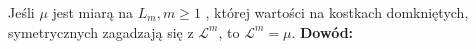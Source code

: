 \begin{lem}
    Jeśli $\mu$ jest miarą na $L_m, m \geq 1$ , której wartości na kostkach domkniętych, symetrycznych zagadzają się z $\mathcal{L}^m$, to $\mathcal{L}^m = \mu$.
    \newline
    \textbf{Dowód:} \citep[AM4, 4.35]{Tworzewski}
\end{lem}